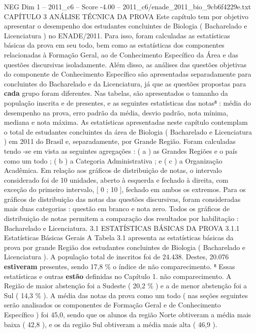 \begin{textsample}{NEG Dim 1 – 2011\_c6 – Score -4.00 – 2011\_c6/enade\_2011\_bio\_9cb6f4229e.txt}  \label{ex:f1_neg_225}
CAPÍTULO 3 ANÁLISE TÉCNICA DA PROVA Este capítulo tem por objetivo apresentar o desempenho dos estudantes concluintes de Biologia ( Bacharelado e Licenciatura ) no ENADE/2011.
Para isso, foram calculadas as estatísticas básicas da prova em seu todo, bem como as estatísticas dos componentes relacionadas à Formação Geral, ao de Conhecimento Específico da Área e das questões discursivas isoladamente.
Além disso, as análises das questões objetivas do componente de Conhecimento Específico são apresentadas separadamente para concluintes do Bacharelado e da Licenciatura, já que as questões propostas para \textbf{cada} grupo foram diferentes.
Nas tabelas, são apresentados o tamanho da população inscrita e de presentes, e as seguintes estatísticas das notas⁸ : média do desempenho na prova, erro padrão da média, desvio padrão, nota mínima, mediana e nota máxima.
As estatísticas apresentadas neste capítulo contemplam o total de estudantes concluintes da área de Biologia ( Bacharelado e Licenciatura ) em 2011 do Brasil e, separadamente, por Grande Região.
Foram calculadas tendo -se em vista as seguintes agregações : ( a ) as Grandes Regiões e o país como um todo ; ( b ) a Categoria Administrativa ; e ( c ) a Organização Acadêmica.
Em relação aos gráficos de distribuição de notas, o intervalo considerado foi de 10 unidades, aberto à esquerda e fechado à direita, com exceção do primeiro intervalo, [ 0 ; 10 ], fechado em ambos os extremos.
Para os gráficos de distribuição das notas das questões discursivas, foram consideradas mais duas categorias : questão em branco e nota zero.
Todos os gráficos de distribuição de notas permitem a comparação dos resultados por habilitação : Bacharelado e Licenciatura. 3.1 ESTATÍSTICAS BÁSICAS DA PROVA 3.1.1 Estatísticas Básicas Gerais A Tabela 3.1 apresenta as estatísticas básicas da prova por grande Região dos estudantes concluintes de Biologia ( Bacharelado e Licenciatura ).
A população total de inscritos foi de 24.438.
Destes, 20.076 \textbf{estiveram} presentes, sendo 17,8 \% o índice de não comparecimento. ⁸ Essas estatísticas e outras \textbf{estão} definidas no Capítulo 1. não comparecimento.
A Região de maior abstenção foi a Sudeste ( 20,2 \% ) e a de menor abstenção foi a Sul ( 14,3 \% ).
A média das notas da prova como um todo ( nas seções seguintes serão analisados os componentes de Formação Geral e de Conhecimento Específico ) foi 45,0, sendo que os alunos da região Norte obtiveram a média mais baixa ( 42,8 ), e os da região Sul obtiveram a média mais alta ( 46,9 ).

\end{textsample}
